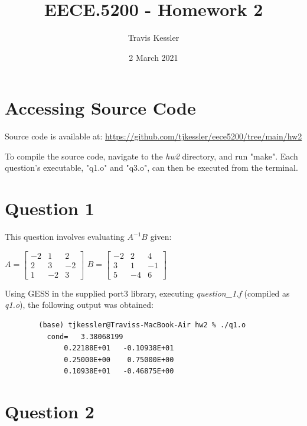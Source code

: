 \documentclass{report}
\title{EECE.5200 - Homework 2}
\author{Travis Kessler}
\date{2 March 2021}
\begin{document}
	\maketitle
	\newpage

	\lstset{frame=lines}

	\section*{Accessing Source Code}
	
	Source code is available at: \href{https://github.com/tjkessler/eece5200/tree/main/hw2}{https://github.com/tjkessler/eece5200/tree/main/hw2}
	
	\textit{}
	
	\noindent To compile the source code, navigate to the \textit{hw2} directory, and run "make". Each question's executable, "q1.o" and "q3.o", can then be executed from the terminal.
	
	\section*{Question 1}
	
	This question involves evaluating \textit{$A^{-1}B$} given:
	
	\textit{}
	
	$A = \begin{bmatrix}
		-2 & 1 & 2 \\
		2 & 3 & -2 \\
		1 & -2 & 3
	\end{bmatrix}$
	$B = \begin{bmatrix}
		-2 & 2 & 4 \\
		3 & 1 & -1 \\
		5 & -4 & 6
	\end{bmatrix}$

	\textit{}
	\textit{}
	
	\noindent Using GESS in the supplied port3 library, executing \textit{question\_1.f} (compiled as \textit{q1.o}), the following output was obtained:
	
	\begin{lstlisting}
		(base) tjkessler@Traviss-MacBook-Air hw2 % ./q1.o 
		  cond=   3.38068199    
		      0.22188E+01   -0.10938E+01
		      0.25000E+00    0.75000E+00
		      0.10938E+01   -0.46875E+00
	\end{lstlisting}

	\section*{Question 2}
	
\end{document}
